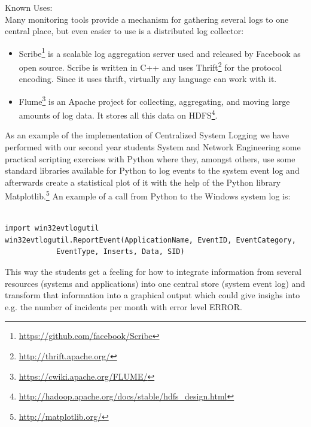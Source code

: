 
\begin{center}
   
\end{center}

Known Uses:\\
Many monitoring tools provide a mechanism for gathering several logs to one central place, but even easier to use is a distributed log collector:
\begin{itemize}
	\item Scribe\footnote{\url{https://github.com/facebook/Scribe}} is a scalable log aggregation server used and released by Facebook as open source. Scribe is written in C++ and uses Thrift\footnote{\url{http://thrift.apache.org/}} for the protocol encoding. Since it uses thrift, virtually any language can work with it.
	\item Flume\footnote{\url{https://cwiki.apache.org/FLUME/}} is an Apache project for collecting, aggregating, and moving large amounts of log data. It stores all this data on HDFS\footnote{\url{http://hadoop.apache.org/docs/stable/hdfs_design.html}}.
\end{itemize}

As an example of the implementation of {\sc Centralized System Logging} we have performed with our second year students System and Network Engineering some practical scripting exercises with Python where they, amongst others, use some standard libraries available for Python to log events to the system event log and afterwards create a statistical plot of it with the help of the Python library Matplotlib.\footnote{\url{http://matplotlib.org/}} 
An example of a call from Python to the Windows system log is:

               
\lstset{language=Python}

\begin{lstlisting}

import win32evtlogutil
win32evtlogutil.ReportEvent(ApplicationName, EventID, EventCategory,
    		EventType, Inserts, Data, SID)

\end{lstlisting}


This way the students get a feeling for how to integrate information from several resources (systems and applications) into one central store (system event log) and transform that information into a graphical output which could give insighs into e.g. the number of incidents per month with error level ERROR.




